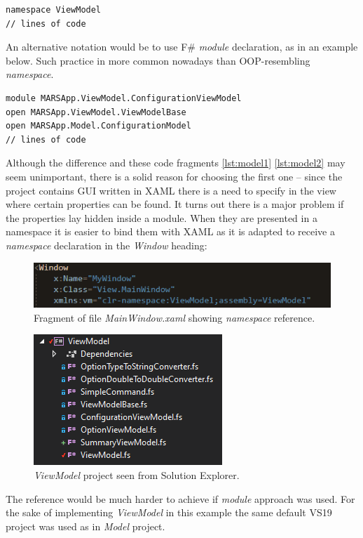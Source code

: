         \begin{lstlisting}[label={lst:model1}, caption=F\# all \textit{ViewModel} project components beginning.]
namespace ViewModel
// lines of code
        \end{lstlisting}
        An alternative notation would be to use F\# \textit{module} declaration, as in an example below. Such practice in more common nowadays than OOP-resembling \textit{namespace}.
        \begin{lstlisting}[label={lst:model2}, caption=F\# alternative example \textit{ViewModel} project component beginning.]
module MARSApp.ViewModel.ConfigurationViewModel
open MARSApp.ViewModel.ViewModelBase
open MARSApp.Model.ConfigurationModel
// lines of code
        \end{lstlisting}
        Although the difference and these code fragments \ref{lst:model1} \ref{lst:model2} may seem unimportant, there is a solid reason for choosing the first one -- since the project contains GUI written in XAML there is a need to specify in the view where certain properties can be found. It turns out there is a major problem if the properties lay hidden inside a module. When they are presented in a namespace it is easier to bind them with XAML as it is adapted to receive a \textit{namespace} declaration in the \textit{Window} heading:
        \begin{figure}[H]
            \centering
            \includegraphics{img/viewmodel_namespace.png}
            \caption{Fragment of file \textit{MainWindow.xaml} showing \textit{namespace} reference.}
            \label{fig:viewmodel_namespace}
        \end{figure}
        \begin{figure}[H]
            \centering
            \includegraphics{img/viewmodel.png}
            \caption{\textit{ViewModel} project seen from Solution Explorer.}
            \label{fig:viewmodel}
        \end{figure} 
        \noindent
        The reference would be much harder to achieve if \textit{module} approach was used. For the sake of implementing \textit{ViewModel} in this example the same default VS19 project was used as in \textit{Model} project.
    
